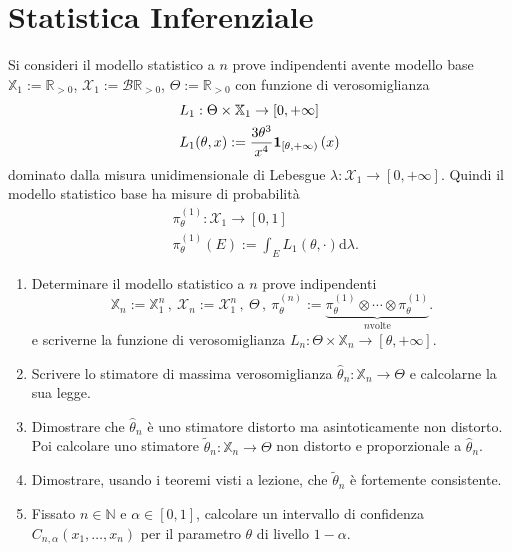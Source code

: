
\section{Statistica Inferenziale}

\begin{esercizio}
  Si consideri il modello statistico a \(n\) prove indipendenti avente
  modello base \(\mathbb{X}_1 := \mathbb{R}_{> 0}\),
  \(\mathcal{X}_1 := \mathcal{B} \mathbb{R}_{> 0}\),
  \(\Theta := \mathbb{R}_{>0}\) con funzione di verosomiglianza
  \begin{align*}
    & L_1 : \Theta \times \mathbb{X}_1 \to [0, +\infty] \\
    & L_1(\theta, x) := \frac{3 \theta^3}{x^4} \mathbf 1_{[\theta, +\infty)}\left(x\right)
  \end{align*}
  dominato dalla misura unidimensionale di Lebesgue
  \(\lambda : \mathcal{X}_1 \to [0, +\infty]\). Quindi il modello statistico base ha misure
  di probabilità
  \begin{align*}
    & \pi_\theta^{(1)} : \mathcal{X}_1 \to [0, 1] \\
    & \pi_\theta^{(1)}(E) := \int_E L_1(\theta,\cdot) \mathrm d \lambda .
  \end{align*}
  \begin{enumerate}[leftmargin=*]

  \item Determinare il modello statistico a \(n\) prove indipendenti
    \[
      \mathbb{X}_n := \mathbb{X}_1^n\,,\ \mathcal{X}_n := \mathcal{X}_1^n\,,\ \Theta \,,\
      \pi_\theta^{(n)} := \underbrace{\pi_\theta^{(1)} \otimes \cdots \otimes \pi_\theta^{(1)}}_{n \text{
          volte}} .
    \]
    e scriverne la funzione di verosomiglianza
    \(L_n : \Theta \times \mathbb{X}_n \to [\theta, +\infty]\).

  \item Scrivere lo stimatore di massima verosomiglianza
    \(\hat\theta_n : \mathbb{X}_n \to \Theta\) e calcolarne la sua legge.

  \item Dimostrare che \(\hat\theta_n\) è uno stimatore distorto ma
    asintoticamente non distorto. Poi calcolare uno stimatore
    \(\tilde\theta_n : \mathbb{X}_n \to \Theta\) non distorto e proporzionale a
    \(\hat\theta_n\).

  \item Dimostrare, usando i teoremi visti a lezione, che
    \(\tilde\theta_n\) è fortemente consistente.

  \item Fissato \(n \in \mathbb{N}\) e \(\alpha \in [0, 1]\), calcolare un intervallo di
    confidenza \(C_{n, \alpha}(x_1, \dots{}, x_n)\) per il parametro
    \(\theta\) di livello \(1-\alpha\).
  \end{enumerate}
\end{esercizio}

